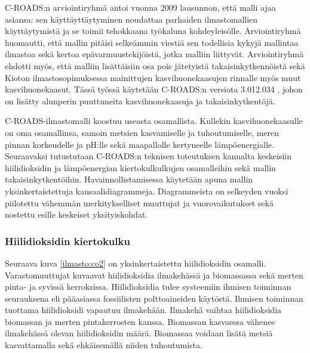 \documentclass[finnish,12pt,a4paper,pdftex]{article}
\begin{document}
\begin{onehalfspacing}
C-ROADS:n arviointiryhmä antoi vuonna 2009 lausunnon, että malli ajaa asiansa: sen käyttäyttäytyminen noudattaa parhaiden ilmastomallien käyttäytymistä ja se toimii tehokkaana työkaluna kohdeyleisölle. Arviointiryhmä huomautti, että mallin pitäisi selkeämmin viestiä sen todellisia kykyjä mallintaa ilmastoa sekä kertoa epävarmuustekijöistä, jotka malliin liittyvät. Arviointiryhmä ehdotti myös, että malliin lisättäisiin osa pois jätetyistä takaisinkytkennöistä sekä Kioton ilmastosopimuksessa \cite{KyotoManual} mainittujen kasvihuonekaasujen rinnalle myös muut kasvihuonekaasut. \cite{Watson2009} Tässä työssä käytetään C-ROADS:n versiota 3.012.034 \cite{Croads}, johon on lisätty alunperin puuttuneita kasvihuonekaasuja ja takaisinkytkentöjä. 

C-ROADS-ilmastomalli koostuu useasta osamallista. Kullekin kasvihuonekaasulle on oma osamallinsa, samoin metsien kasvamiselle ja tuhoutumiselle, meren pinnan korkeudelle ja pH:lle sekä maapallolle kertyneelle lämpöenergialle. \cite{Croads, CroadsFlightSimulator2011, Fiddaman2012} Seuraavaksi tutustutaan C-ROADS:n teknisen toteutuksen kannalta keskeisiin hiilidioksidin ja lämpöenergian kiertokulkulkujen osamalleihin sekä mallin takaisinkytkentöihin. Havainnollistamisessa käytetään apuna mallin yksinkertaistettuja kausaalidiagrammeja. Diagrammeista on selkeyden vuoksi piilotettu vähemmän merkitykselliset muuttujat ja vuorovaikutukset sekä nostettu esille keskeiset yksityiskohdat. 

\subsubsection*{Hiilidioksidin kiertokulku \label{ilmasto:croads:co2}}

Seuraava kuva \ref{ilmasto:co2} on yksinkertaistettu hiilidioksidin osamalli. Varastomuuttujat kuvaavat hiilidioksidia ilmakehässä ja biomassassa sekä merten pinta- ja syvissä kerroksissa. Hiilidioksidia tulee systeemiin ihmisen toiminnan seurauksena eli pääasiassa fossiilisten polttoaineiden käytöstä. Ihmisen toiminnan tuottama hiilidioksidi vapautuu ilmakehään. Ilmakehä vaihtaa hiilidioksidia biomassan ja merten pintakerrosten kanssa. Biomassan kasvaessa vähenee ilmakehässä olevan hiilidioksidin määrä. Biomassaa voidaan lisätä metsiä kasvattamalla sekä ehkäisemällä niiden tuhoutumista. \cite{Croads, CroadsFlightSimulator2011}


\end{onehalfspacing}
\end{document}
